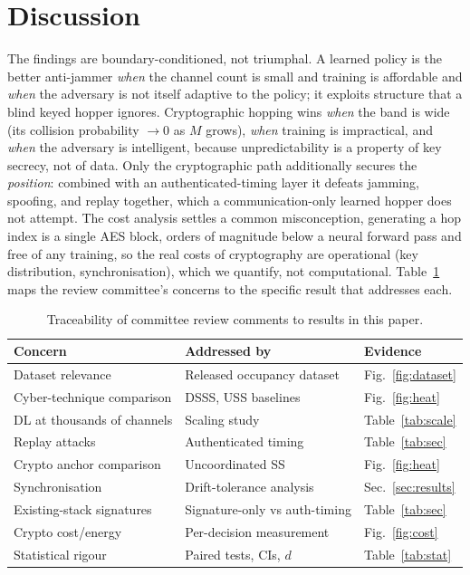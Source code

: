 \documentclass[11pt]{article}
\begin{document}
\section{Discussion}\label{sec:discussion}
The findings are boundary-conditioned, not triumphal. A learned policy is the
better anti-jammer \emph{when} the channel count is small and training is
affordable and \emph{when} the adversary is not itself adaptive to the policy;
it exploits structure that a blind keyed hopper ignores. Cryptographic hopping
wins \emph{when} the band is wide (its collision probability $\to 0$ as $M$
grows), \emph{when} training is impractical, and \emph{when} the adversary is
intelligent, because unpredictability is a property of key secrecy, not of data.
Only the cryptographic path additionally secures the \emph{position}: combined
with an authenticated-timing layer it defeats jamming, spoofing, and replay
together, which a communication-only learned hopper does not attempt. The cost
analysis settles a common misconception, generating a hop index is a single AES
block, orders of magnitude below a neural forward pass and free of any training,
so the real costs of cryptography are operational (key distribution,
synchronisation), which we quantify, not computational.
Table~\ref{tab:coverage} maps the review committee's concerns to the specific
result that addresses each.

\begin{table}[H]\centering
\caption{Traceability of committee review comments to results in this
paper.}\label{tab:coverage}\small
\begin{tabular}{lll}\toprule
\textbf{Concern} & \textbf{Addressed by} & \textbf{Evidence} \\ \midrule
Dataset relevance          & Released occupancy dataset & Fig.~\ref{fig:dataset} \\
Cyber-technique comparison & DSSS, USS baselines        & Fig.~\ref{fig:heat} \\
DL at thousands of channels& Scaling study              & Table~\ref{tab:scale} \\
Replay attacks             & Authenticated timing       & Table~\ref{tab:sec} \\
Crypto anchor comparison   & Uncoordinated SS~\cite{ref2}& Fig.~\ref{fig:heat} \\
Synchronisation            & Drift-tolerance analysis   & Sec.~\ref{sec:results} \\
Existing-stack signatures  & Signature-only vs auth-timing & Table~\ref{tab:sec} \\
Crypto cost/energy         & Per-decision measurement   & Fig.~\ref{fig:cost} \\
Statistical rigour         & Paired tests, CIs, $d$     & Table~\ref{tab:stat} \\ \bottomrule
\end{tabular}
\end{table}
\end{document}
